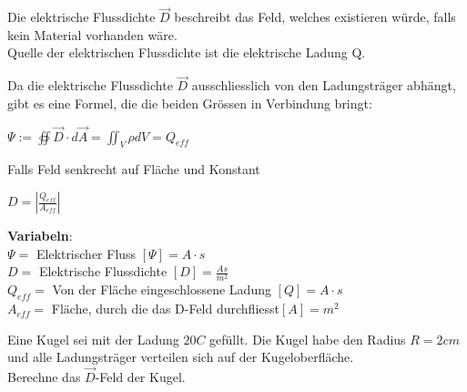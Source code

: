 \beginip
Die elektrische Flussdichte $\vec{D}$ beschreibt das Feld, welches existieren würde, falls kein Material vorhanden wäre. \\
Quelle der elektrischen Flussdichte ist die elektrische Ladung Q.
\iend

Da die elektrische Flussdichte  $\vec{D}$ ausschliesslich von den Ladungsträger abhängt,
gibt es eine Formel, die die beiden Grössen in Verbindung bringt:


\begingl
\begin{center}
	\formulaBegin
	$\Psi := \oiint \vec{D}\cdot d\vec{A} = \iint_V \rho dV = Q_{eff}$
	\formulaEnd

	Falls Feld senkrecht auf Fläche und Konstant \\
	\fspace

	\formulaBegin
	$D = |\frac{Q_{eff}}{A_{eff}}|$
	\formulaEnd

\end{center}
\textbf{Variabeln}: \\
$\Psi = $ Elektrischer Fluss $ [\Psi] = A \cdot s $ \\
$D = $ Elektrische Flussdichte $ [D] = \frac{As}{m^2}$ \\
$ Q_{eff} = $ Von der Fläche eingeschlossene Ladung $[Q] = A\cdot s$ \\
$ A_{eff} = $ Fläche, durch die das D-Feld durchfliesst$ [A] = m^2$ \\

\iend

\beginbsp
Eine Kugel sei mit der Ladung $20 C$ gefüllt. Die Kugel habe den Radius $R = 2cm$ und alle Ladungsträger verteilen sich auf der Kugeloberfläche. \\
Berechne das $\vec{D}$-Feld der Kugel.
\iend


\newpage


